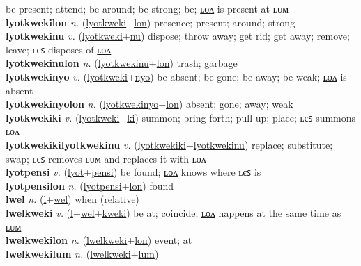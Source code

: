 be present; attend; be around; be strong; be; \hyperref[lyotkwekilon]{ʟᴏᴧ} is present at ʟᴜᴍ \label{lyotkweki} \\
\textbf{lyotkwekilon} \textit{n.} (\hyperref[lyotkweki]{lyotkweki}+\hyperref[lon]{lon})
presence; present; around; strong \label{lyotkwekilon} \\
\textbf{lyotkwekinu} \textit{v.} (\hyperref[lyotkweki]{lyotkweki}+\hyperref[nu]{nu})
dispose; throw away; get rid; get away; remove; leave; ʟєꜱ disposes of \hyperref[lyotkwekinulon]{ʟᴏᴧ} \label{lyotkwekinu} \\
\textbf{lyotkwekinulon} \textit{n.} (\hyperref[lyotkwekinu]{lyotkwekinu}+\hyperref[lon]{lon})
trash; garbage \label{lyotkwekinulon} \\
\textbf{lyotkwekinyo} \textit{v.} (\hyperref[lyotkweki]{lyotkweki}+\hyperref[nyo]{nyo})
be absent; be gone; be away; be weak; \hyperref[lyotkwekinyolon]{ʟᴏᴧ} is absent \label{lyotkwekinyo} \\
\textbf{lyotkwekinyolon} \textit{n.} (\hyperref[lyotkwekinyo]{lyotkwekinyo}+\hyperref[lon]{lon})
absent; gone; away; weak \label{lyotkwekinyolon} \\
\textbf{lyotkwekiki} \textit{v.} (\hyperref[lyotkweki]{lyotkweki}+\hyperref[ki]{ki})
summon; bring forth; pull up; place; ʟєꜱ summons ʟᴏᴧ \label{lyotkwekiki} \\
\textbf{lyotkwekikilyotkwekinu} \textit{v.} (\hyperref[lyotkwekiki]{lyotkwekiki}+\hyperref[lyotkwekinu]{lyotkwekinu})
replace; substitute; swap; ʟєꜱ removes ʟᴜᴍ and replaces it with ʟᴏᴧ \label{lyotkwekikilyotkwekinu} \\
\textbf{lyotpensi} \textit{v.} (\hyperref[lyot]{lyot}+\hyperref[pensi]{pensi})
be found; \hyperref[lyotpensilon]{ʟᴏᴧ} knows where ʟєꜱ is \label{lyotpensi} \\
\textbf{lyotpensilon} \textit{n.} (\hyperref[lyotpensi]{lyotpensi}+\hyperref[lon]{lon})
found \label{lyotpensilon} \\
\textbf{lwel} \textit{n.} (\hyperref[l]{l}+\hyperref[wel]{wel})
when (relative) \label{lwel} \\
\textbf{lwelkweki} \textit{v.} (\hyperref[l]{l}+\hyperref[wel]{wel}+\hyperref[kweki]{kweki})
be at; coincide; \hyperref[lwelkwekilon]{ʟᴏᴧ} happens at the same time as \hyperref[lwelkwekilum]{ʟᴜᴍ} \label{lwelkweki} \\
\textbf{lwelkwekilon} \textit{n.} (\hyperref[lwelkweki]{lwelkweki}+\hyperref[lon]{lon})
event; at \label{lwelkwekilon} \\
\textbf{lwelkwekilum} \textit{n.} (\hyperref[lwelkweki]{lwelkweki}+\hyperref[lum]{lum})

